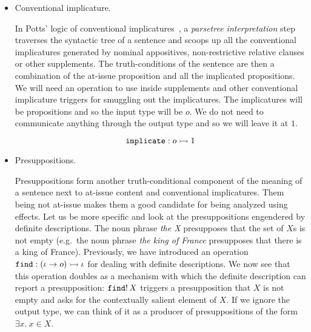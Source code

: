 \begin{itemize}
\item Conventional implicature.
  
  In Potts' logic of conventional implicatures~\cite{potts2005logic}, a
  \emph{parsetree interpretation} step traverses the syntactic tree of a
  sentence and scoops up all the conventional implicatures generated by
  nominal appositives, non-restrictive relative clauses or other
  supplements. The truth-conditions of the sentence are then a combination
  of the at-issue proposition and all the implicated propositions. We will
  need an operation to use inside supplements and other conventional
  implicature triggers for smuggling out the implicatures. The implicatures
  will be propositions and so the input type will be $o$. We do not need to
  communicate anything through the output type and so we will leave it at
  $1$.

  $$
  \mathtt{implicate} : o \rightarrowtail 1
  $$

\item Presuppositions.

  Presuppositions form another truth-conditional component of the meaning
  of a sentence next to at-issue content and conventional
  implicatures. Them being not at-issue makes them a good candidate for
  being analyzed using effects. Let us be more specific and look at the
  presuppositions engendered by definite descriptions. The noun phrase
  \emph{the X} presupposes that the set of $X$s is not empty (e.g.\ the
  noun phrase \emph{the king of France} presupposes that there is a king of
  France). Previously, we have introduced an operation
  $\mathtt{find} : (\iota \to o) \rightarrowtail \iota$ for dealing with definite
  descriptions. We now see that this operation doubles as a mechanism with
  which the definite description can report a presupposition:
  $\mathtt{find}!\,X$ triggers a presupposition that $X$ is not empty and
  asks for the contextually salient element of $X$. If we ignore the output
  type, we can think of it as a producer of presuppositions of the form
  $\exists x.\ x \in X$.
\end{itemize}

